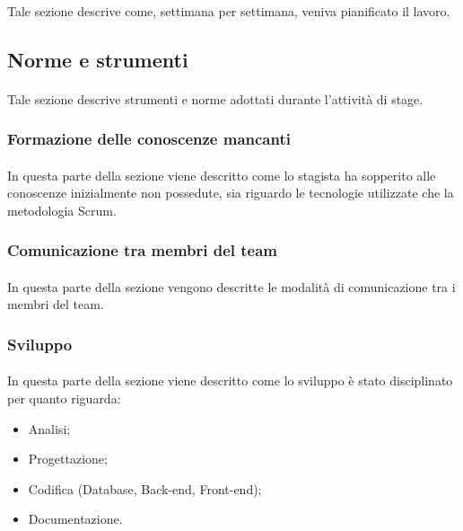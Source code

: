 \documentclass[
article,
10pt, %
oneside, %
BCOR5mm, %
]{scrartcl}
\begin{document}
\paragraph{} Tale sezione descrive come, settimana per settimana, veniva
pianificato il lavoro.

\subsection{Norme e strumenti}
\paragraph{} Tale sezione descrive strumenti e norme adottati durante
l'attività di stage.

\subsubsection{Formazione delle conoscenze mancanti}
\paragraph{} In questa parte della sezione viene descritto come lo stagista ha
sopperito alle conoscenze inizialmente non possedute, sia riguardo le
tecnologie utilizzate che la metodologia Scrum.

\subsubsection{Comunicazione tra membri del team}
\paragraph{} In questa parte della sezione vengono descritte le modalità di
comunicazione tra i membri del team.

\subsubsection{Sviluppo}
\paragraph{} In questa parte della sezione viene descritto come lo sviluppo è
stato disciplinato per quanto riguarda:
\begin{itemize}
\item Analisi;
\item Progettazione;
\item Codifica (Database, Back-end, Front-end);
\item Documentazione.
\end{itemize}
\end{document}
